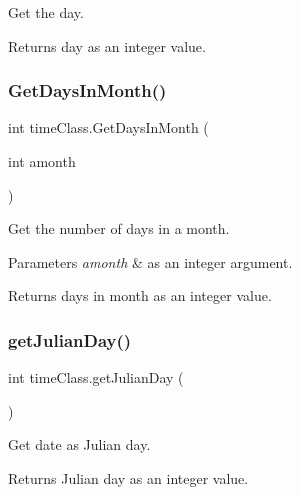 Get the day. 

\begin{DoxyReturn}{Returns}
day as an integer value. 
\end{DoxyReturn}
\mbox{\label{classtime_class_a32dd8f1721ce77bac40e301d14805be4}} 
\subsubsection{\texorpdfstring{GetDaysInMonth()}{GetDaysInMonth()}}
{\footnotesize\ttfamily int time\+Class.\+Get\+Days\+In\+Month (\begin{DoxyParamCaption}\item[{int}]{amonth }\end{DoxyParamCaption})\hspace{0.3cm}{\ttfamily [inline]}}



Get the number of days in a month. 


\begin{DoxyParams}{Parameters}
{\em amonth} & as an integer argument. \\
\hline
\end{DoxyParams}
\begin{DoxyReturn}{Returns}
days in month as an integer value. 
\end{DoxyReturn}
\mbox{\label{classtime_class_a56c018f6d4c6da5e8bc48cc4c7229d86}} 
\subsubsection{\texorpdfstring{getJulianDay()}{getJulianDay()}}
{\footnotesize\ttfamily int time\+Class.\+get\+Julian\+Day (\begin{DoxyParamCaption}{ }\end{DoxyParamCaption})\hspace{0.3cm}{\ttfamily [inline]}}



Get date as Julian day. 

\begin{DoxyReturn}{Returns}
Julian day as an integer value. 
\end{DoxyReturn}
\mbox{\label{classtime_class_a33068a0b7d33d339875e4e31382223f2}} 
